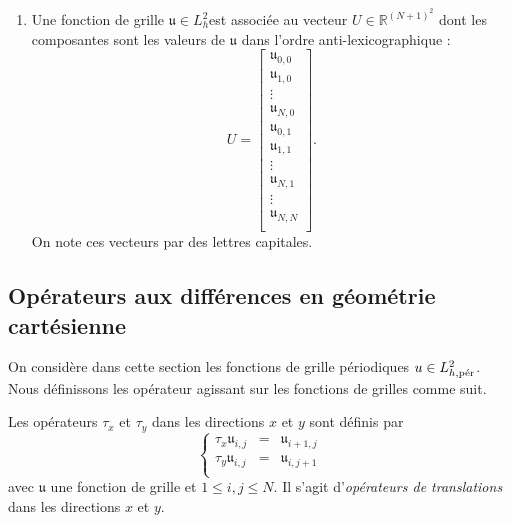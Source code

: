 \begin{enumerate}
\item Une fonction de grille $\mathfrak{u} \in L^2_h$est associée au vecteur $U \in \mathbb{R}^{(N+1)^2}$ dont les composantes sont les valeurs de $\mathfrak{u}$ dans l'ordre anti-lexicographique :
\begin{equation}
U = \begin{bmatrix}
\mathfrak{u}_{0,0}\\
\mathfrak{u}_{1,0}\\
\vdots \\
\mathfrak{u}_{N,0}\\
\mathfrak{u}_{0,1}\\
\mathfrak{u}_{1,1}\\
\vdots \\
\mathfrak{u}_{N,1}\\
\vdots \\
\mathfrak{u}_{N,N}\\
\end{bmatrix}.
\end{equation}
On note ces vecteurs par des lettres capitales.
\end{enumerate}















%
\subsection{Opérateurs aux différences en géométrie cartésienne}

On considère dans cette section les fonctions de grille périodiques $u \in L^2_{h,\per}$. Nous définissons les opérateur agissant sur les fonctions de grilles comme suit.

\begin{definition}
Les opérateurs $\tau_x$ et $\tau_y$ dans les directions $x$ et $y$ sont définis par
\begin{equation}
\left\lbrace
\begin{array}{rcl}
\tau_x \mathfrak{u}_{i,j} & = & \mathfrak{u}_{i+1,j}\\
\tau_y \mathfrak{u}_{i,j} & = & \mathfrak{u}_{i,j+1}\\
\end{array}
\right.
\end{equation}
avec $\mathfrak{u}$ une fonction de grille et $1 \leq i,j \leq N$. Il s'agit d'\textit{opérateurs de translations} dans les directions $x$ et $y$.
\end{definition}

